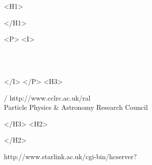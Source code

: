 \begin{htmlonly}
   \xlabel{}
   \begin{rawhtml} <H1> \end{rawhtml}
      \stardoctitle
   \begin{rawhtml} </H1> \end{rawhtml}
 
 
   \begin{rawhtml} <P> <I> \end{rawhtml}
   \stardoccategory \stardocnumber \\
   \stardocauthors \\
   \stardocdate
   \begin{rawhtml} </I> </P> <H3> \end{rawhtml}
       /
                        {http://www.cclrc.ac.uk/ral} \\
      Particle Physics \& Astronomy Research Council \\
   \begin{rawhtml} </H3> <H2> \end{rawhtml}
   \begin{rawhtml} </H2> \end{rawhtml}
      {http://www.starlink.ac.uk/cgi-bin/hcserver?\stardocsource}\\
 
 
 
\end{htmlonly}
 
